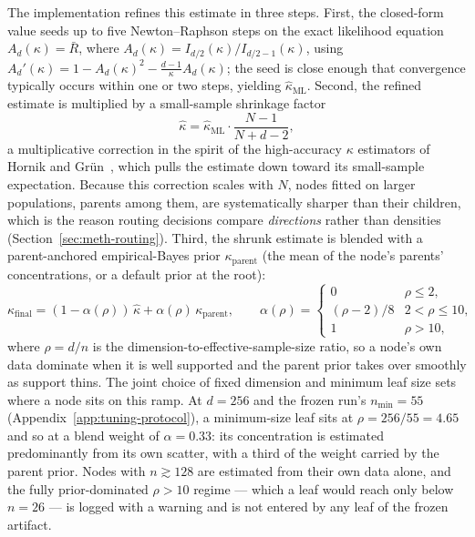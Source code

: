 The implementation refines this estimate in three steps.
First, the closed-form value seeds up to five Newton--Raphson steps
on the exact likelihood equation $A_d(\kappa) = \bar{R}$, where
$A_d(\kappa) = I_{d/2}(\kappa)/I_{d/2-1}(\kappa)$, using
$A_d'(\kappa) = 1 - A_d(\kappa)^2 - \tfrac{d-1}{\kappa}A_d(\kappa)$;
the seed is close enough that convergence typically occurs within one
or two steps, yielding $\hat{\kappa}_{\text{ML}}$.
Second, the refined estimate is multiplied by a small-sample
shrinkage factor
\[
\hat{\kappa}
= \hat{\kappa}_{\text{ML}} \cdot \frac{N - 1}{N + d - 2},
\]
a multiplicative correction in the spirit of the high-accuracy
$\kappa$ estimators of Hornik and Gr\"{u}n~\parencite{hornik2014vmf},
which pulls the estimate down toward its small-sample
expectation.
Because this correction scales with $N$, nodes fitted on larger
populations, parents among them, are systematically sharper than their
children, which is the reason routing decisions compare
\emph{directions} rather than densities
(Section~\ref{sec:meth-routing}).
Third, the shrunk estimate is blended with a parent-anchored
empirical-Bayes prior $\kappa_{\text{parent}}$ (the mean of the
node's parents' concentrations, or a default prior at the root):
\[
\kappa_{\text{final}}
= (1 - \alpha(\rho))\,\hat{\kappa}
+ \alpha(\rho)\,\kappa_{\text{parent}},
\qquad
\alpha(\rho) =
\begin{cases}
0 & \rho \leq 2,\\
(\rho - 2)/8 & 2 < \rho \leq 10,\\
1 & \rho > 10,
\end{cases}
\]
where $\rho = d/n$ is the dimension-to-effective-sample-size ratio,
so a node's own data dominate when it is well supported and the
parent prior takes over smoothly as support thins.
The joint choice of fixed dimension and minimum leaf size sets where a
node sits on this ramp. At $d = 256$ and the frozen run's
$n_{\min} = 55$ (Appendix~\ref{app:tuning-protocol}), a minimum-size
leaf sits at $\rho = 256/55 = 4.65$ and so at a blend weight of
$\alpha = 0.33$: its concentration is estimated predominantly from its
own scatter, with a third of the weight carried by the parent prior.
Nodes with $n \gtrsim 128$ are estimated from their own data alone, and
the fully prior-dominated $\rho > 10$ regime --- which a leaf would
reach only below $n = 26$ --- is logged with a warning and is not
entered by any leaf of the frozen artifact.

